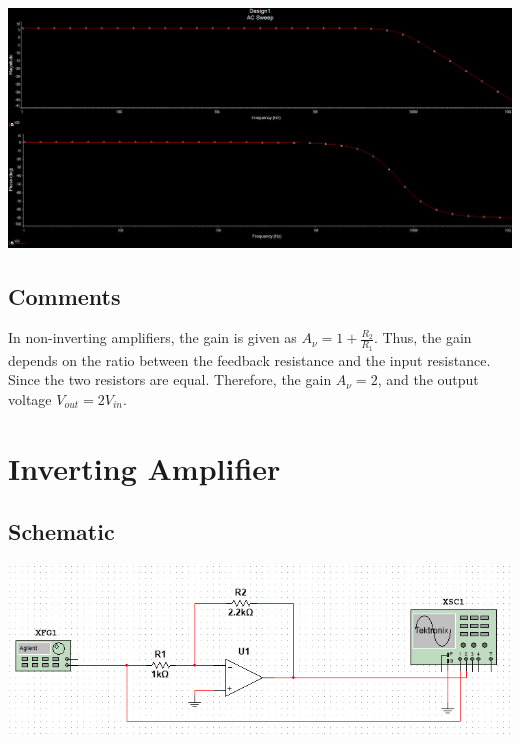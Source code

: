 \documentclass[a4paper, 12pt, english]{article}
\newenvironment{Figure}
  {\par\medskip\noindent\minipage{\linewidth}}
  {\endminipage\par\medskip}
\begin{document}
\begin{Figure}
 \centering
 \includegraphics[width=\linewidth, scale=2]{images/nonInvertFrequencyResponseSin.png}
\end{Figure}

\subsection{Comments}
In non-inverting amplifiers, the gain is given as \( A_{\nu} = 1 + \frac{R_{2}}{R_{1}} \). Thus, the gain depends on the ratio between the feedback resistance and the input resistance. Since the two resistors are equal. Therefore, the gain \( A_{\nu} = 2 \), and the output voltage \( V_{out} = 2V_{in} \).

\newpage
\section{Inverting Amplifier}
\subsection{Schematic}
\begin{Figure}
 \centering
 \includegraphics[width=1.2\linewidth, scale=2]{images/invertingSchematic.png}
\end{Figure}
\end{document}
